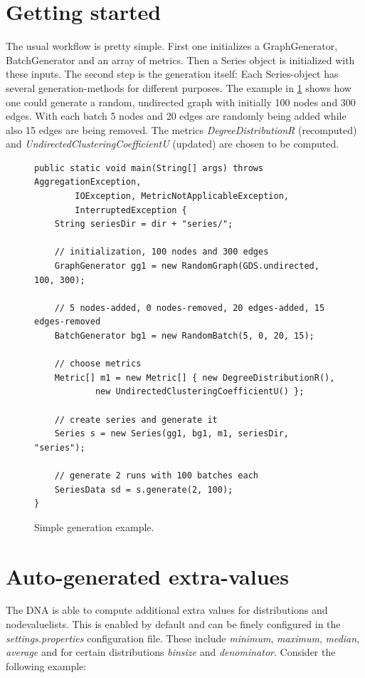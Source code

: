 \section{Getting started}
The usual workflow is pretty simple. First one initializes a GraphGenerator, BatchGenerator and an array of metrics. Then a Series object is initialized with these inputs. The second step is the generation itself: Each Series-object has several generation-methods for different purposes. The example in \ref{code:example1} shows how one could generate a random, undirected graph with initially 100 nodes and 300 edges. With each batch 5 nodes and 20 edges are randomly being added while also 15 edges are being removed. The metrics \textit{DegreeDistributionR} (recomputed) and \textit{UndirectedClusteringCoefficientU} (updated) are chosen to be computed. 

\begin{figure} [h]
\begin{lstlisting}
public static void main(String[] args) throws AggregationException,
		IOException, MetricNotApplicableException,
		InterruptedException {
	String seriesDir = dir + "series/";

	// initialization, 100 nodes and 300 edges
	GraphGenerator gg1 = new RandomGraph(GDS.undirected, 100, 300);
	
	// 5 nodes-added, 0 nodes-removed, 20 edges-added, 15 edges-removed
	BatchGenerator bg1 = new RandomBatch(5, 0, 20, 15);
	
	// choose metrics
	Metric[] m1 = new Metric[] { new DegreeDistributionR(),
			new UndirectedClusteringCoefficientU() };

	// create series and generate it
	Series s = new Series(gg1, bg1, m1, seriesDir, "series");
	
	// generate 2 runs with 100 batches each
	SeriesData sd = s.generate(2, 100);
}
\end{lstlisting}
\caption{Simple generation example.}
\label{code:example1}
\end{figure}

\section{Auto-generated extra-values}
The DNA is able to compute additional extra values for distributions and nodevaluelists. This is enabled by default and can be finely configured in the \textit{settings.properties} configuration file. These include \textit{minimum}, \textit{maximum}, \textit{median}, \textit{average} and for certain distributions \textit{binsize} and \textit{denominator}. Consider the following example:\\

